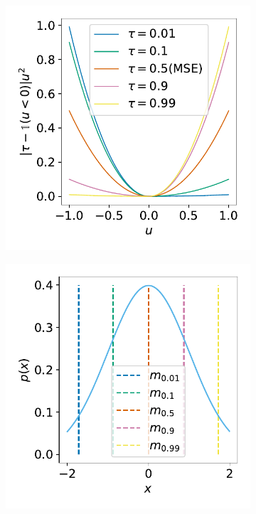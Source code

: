 \documentclass{article} %
\begin{document}
\begin{figure}
\centering
\begin{subfigure}[t]{0.32\textwidth}
    \centering
    \includegraphics[width=\textwidth]{images/expectile_loss.pdf}
\end{subfigure}
\begin{subfigure}[t]{0.32\textwidth}
    \centering
    \includegraphics[width=\textwidth]{images/expectile_normal.pdf}

\end{subfigure}
\end{figure}
\end{document}
